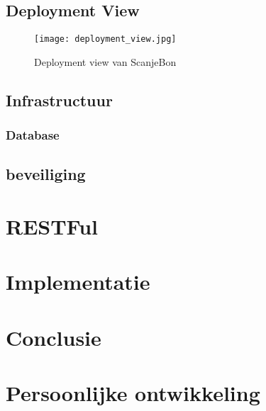 \documentclass[a4paper,11pt,oneside]{report}
\begin{document}
\section{Deployment View}
\begin{figure}[ht!]
\centering
\texttt{[image: deployment\_view.jpg]}\\
\label{deployment_view}
\caption{Deployment view van ScanjeBon}
\end{figure}
\section{Infrastructuur}
\subsection{Database}
\section{beveiliging}
\chapter{RESTFul}



\chapter{Implementatie}











\chapter{Conclusie}




\appendix
\chapter{Persoonlijke ontwikkeling}
\lipsum[1]
\end{document}
